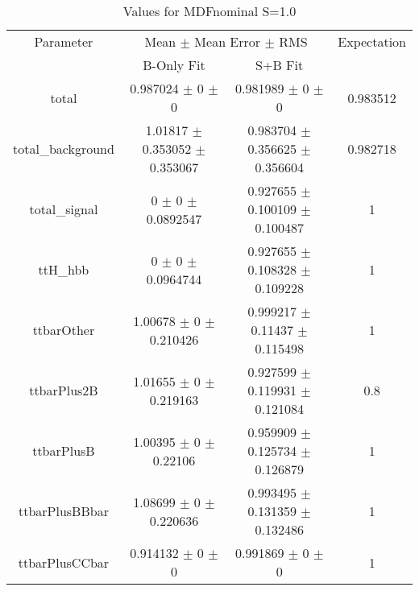 \begin{table}
\centering
\caption{Values for MDFnominal S=1.0}
\begin{tabular}{cccc}
\toprule
Parameter & \multicolumn{2}{c}{Mean $\pm$ Mean Error $\pm$ RMS} & Expectation\\
 & B-Only Fit & S+B Fit & \\
\midrule
total & \num{0.987024} $\pm$ \num{0} $\pm$ \num{0} & \num{0.981989} $\pm$ \num{0} $\pm$ \num{0} & \num{0.983512}\\
total\_background & \num{1.01817} $\pm$ \num{0.353052} $\pm$ \num{0.353067} & \num{0.983704} $\pm$ \num{0.356625} $\pm$ \num{0.356604} & \num{0.982718}\\
total\_signal & \num{0} $\pm$ \num{0} $\pm$ \num{0.0892547} & \num{0.927655} $\pm$ \num{0.100109} $\pm$ \num{0.100487} & \num{1}\\
ttH\_hbb & \num{0} $\pm$ \num{0} $\pm$ \num{0.0964744} & \num{0.927655} $\pm$ \num{0.108328} $\pm$ \num{0.109228} & \num{1}\\
ttbarOther & \num{1.00678} $\pm$ \num{0} $\pm$ \num{0.210426} & \num{0.999217} $\pm$ \num{0.11437} $\pm$ \num{0.115498} & \num{1}\\
ttbarPlus2B & \num{1.01655} $\pm$ \num{0} $\pm$ \num{0.219163} & \num{0.927599} $\pm$ \num{0.119931} $\pm$ \num{0.121084} & \num{0.8}\\
ttbarPlusB & \num{1.00395} $\pm$ \num{0} $\pm$ \num{0.22106} & \num{0.959909} $\pm$ \num{0.125734} $\pm$ \num{0.126879} & \num{1}\\
ttbarPlusBBbar & \num{1.08699} $\pm$ \num{0} $\pm$ \num{0.220636} & \num{0.993495} $\pm$ \num{0.131359} $\pm$ \num{0.132486} & \num{1}\\
ttbarPlusCCbar & \num{0.914132} $\pm$ \num{0} $\pm$ \num{0} & \num{0.991869} $\pm$ \num{0} $\pm$ \num{0} & \num{1}\\
\bottomrule
\end{tabular}
\end{table}
